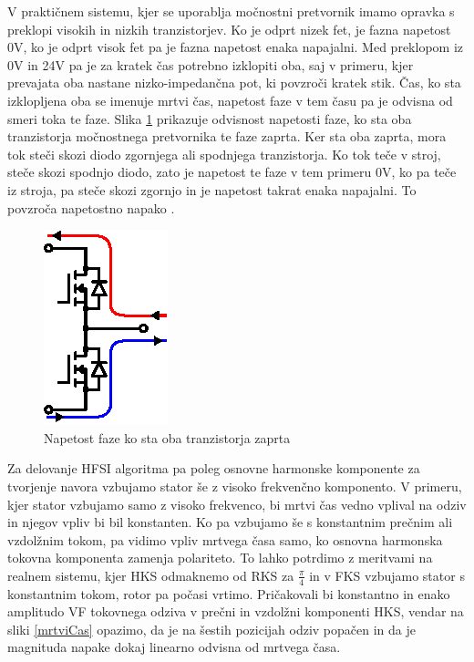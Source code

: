 \documentclass[a4paper,twoside,openright,12pt,slovene]{book}
\begin{document}
V praktičnem sistemu, kjer se uporablja močnostni pretvornik imamo opravka s preklopi visokih in nizkih tranzistorjev. Ko je odprt nizek fet, je fazna napetost 0V, ko je odprt visok fet pa je fazna
napetost enaka napajalni. Med preklopom iz 0V in 24V pa je za kratek čas potrebno izklopiti oba, saj v primeru, kjer prevajata oba nastane nizko-impedančna pot, ki povzroči kratek stik. Čas, ko sta
izklopljena oba se imenuje mrtvi čas, napetost faze v tem času pa je odvisna od smeri toka te faze. Slika \ref{mrtviCasRazlaga} prikazuje odvisnost napetosti faze, ko sta oba tranzistorja močnostnega
pretvornika te faze zaprta. Ker sta oba zaprta, mora tok steči skozi diodo zgornjega ali spodnjega tranzistorja. Ko tok teče v stroj, steče skozi spodnjo diodo, zato je napetost te faze v tem primeru
0V, ko pa teče iz stroja, pa steče skozi zgornjo in je napetost takrat enaka napajalni. To povzroča napetostno napako \cite{ambrovzivc2016elektrivcni}.

\begin{figure}[!htbp]
    \centering
    \includegraphics[width=0.4\columnwidth]{Slike/Inkscape/mrtviCasRazlaga.eps}
    \caption{\label{mrtviCasRazlaga} Napetost faze ko sta oba tranzistorja zaprta}
\end{figure}

Za delovanje HFSI algoritma pa poleg osnovne harmonske komponente za tvorjenje navora vzbujamo stator še z visoko frekvenčno komponento. V primeru, kjer stator vzbujamo samo z visoko frekvenco, bi
mrtvi čas vedno vplival na odziv in njegov vpliv bi bil konstanten. Ko pa vzbujamo še s konstantnim prečnim ali vzdolžnim tokom, pa vidimo vpliv mrtvega časa samo, ko osnovna harmonska tokovna
komponenta zamenja polariteto. To lahko potrdimo z meritvami na realnem sistemu, kjer HKS odmaknemo od RKS za $\frac{\pi}{4}$ in v FKS vzbujamo stator s konstantnim tokom, rotor pa počasi vrtimo.
Pričakovali bi konstantno in enako amplitudo VF tokovnega odziva v prečni in vzdolžni komponenti HKS, vendar na sliki \ref{mrtviCas} opazimo, da je na šestih pozicijah odziv popačen in da je magnituda
napake dokaj linearno odvisna od mrtvega časa.
\end{document}
